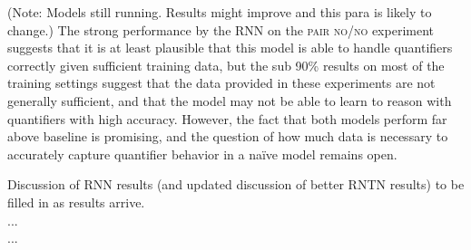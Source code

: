  (Note: Models still running. Results might improve and this para is likely to change.) The strong performance by the RNN on the \textsc{pair no/no} experiment suggests that it is at least plausible that this model is able to handle quantifiers correctly given sufficient training data, but the sub 90\% results on most of the training settings suggest that the data provided in these experiments are not generally sufficient, and that the model may not be able to learn to reason with quantifiers with high accuracy. However, the fact that both models perform far above baseline is promising, and the question of how much data is necessary to accurately capture quantifier behavior in a na\"ive model remains open.

Discussion of RNN results (and updated discussion of better RNTN results) to be filled in as results arrive.\\...\\... %
